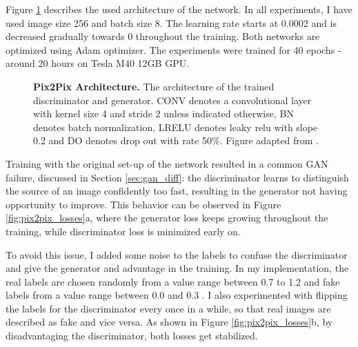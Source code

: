 \documentclass[12pt]{report}
\begin{document}
Figure \ref{fig:pix2pix_arch} describes the used architecture of the network. In all experiments, I have used image size 256 and batch size 8. The learning rate starts at 0.0002 and is decreased gradually towards 0 throughout the training. Both networks are optimized using Adam optimizer. The experiments were trained for 40 epochs - around 20 hours on Tesla M40 12GB GPU.

\begin{figure}[h]
\centering
{}\vspace{.5cm}
\caption{\label{fig:pix2pix_arch} \textbf{Pix2Pix Architecture.} The architecture of the trained  discriminator and generator. CONV denotes a convolutional layer with kernel size 4 and stride 2 unless indicated otherwise, BN denotes batch normalization, LRELU denotes leaky relu with slope 0.2 and DO denotes drop out with rate 50\%. Figure adapted from \cite{hesse_image--image_2017}.}
\end{figure}

Training with the original set-up of the network resulted in a common GAN failure, discussed in Section \ref{sec:gan_diff}: the discriminator learns to distinguish the source of an image confidently too fast, resulting in the generator not having opportunity to improve. This behavior can be observed in Figure \ref{fig:pix2pix_losses}a, where the generator loss keeps growing throughout the training, while discriminator loss is minimized early on.

To avoid this issue, I added some noise to the labels to confuse the discriminator and give the generator and advantage in the training. In my implementation, the real labels are chosen randomly from a value range between 0.7 to 1.2 and fake labels from a value range between 0.0 and 0.3 \cite{chintala_starter_2018}. I also experimented with flipping the labels for the discriminator every once in a while, so that real images are described as fake and vice versa. As shown in Figure \ref{fig:pix2pix_losses}b, by disadvantaging the discriminator, both losses get stabilized.
\end{document}
